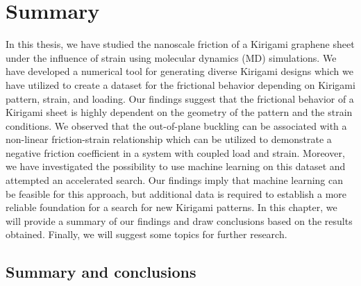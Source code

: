 \chapter{Summary}\label{chap:summary}
In this thesis, we have studied the nanoscale friction of a Kirigami graphene
sheet under the influence of strain using molecular dynamics (\acrshort{MD})
simulations. We have developed a numerical tool for generating diverse Kirigami
designs which we have utilized to create a dataset for the frictional behavior
depending on Kirigami pattern, strain, and loading. Our findings suggest that
the frictional behavior of a Kirigami sheet is highly dependent on the geometry
of the pattern and the strain conditions. We observed that the out-of-plane
buckling can be associated with a non-linear friction-strain relationship which
can be utilized to demonstrate a negative friction coefficient in a system with
coupled load and strain. Moreover, we have investigated the possibility to use
machine learning on this dataset and attempted an accelerated search. Our
findings imply that machine learning can be feasible for this approach, but
additional data is required to establish a more reliable foundation for a search
for new Kirigami patterns. In this chapter, we will provide a summary of our
findings and draw conclusions based on the results obtained. Finally, we will
suggest some topics for further research.


\section{Summary and conclusions}

